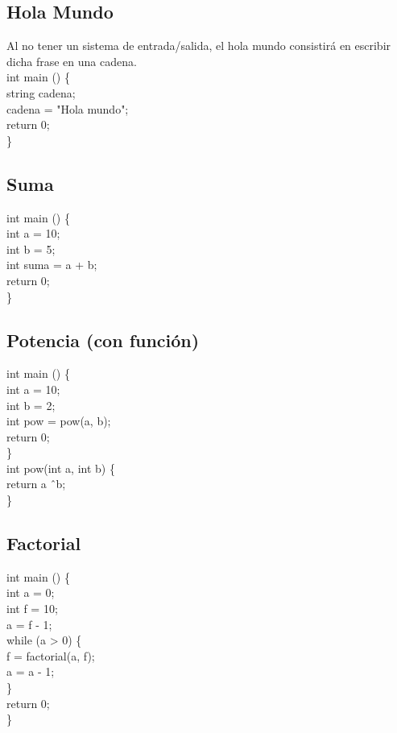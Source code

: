 \documentclass[a4paper, 12pt]{article}
\begin{document}
\subsection{Hola Mundo}
Al no tener un sistema de entrada/salida, el hola mundo consistirá en escribir dicha frase en una cadena.\\

int main () \{ \\
string cadena;\\
cadena = "Hola mundo";\\
return 0;\\
\}

\subsection{Suma}
int main () \{ \\
int a = 10;\\
int b = 5;\\
int suma = a + b;\\
return 0;\\
\}

\subsection{Potencia (con función)}
int main () \{ \\
int a = 10;\\
int b = 2;\\
int pow = pow(a, b);\\
return 0;\\
\}\\

int pow(int a, int b) \{ \\
return a \^\ b;\\
\}
\newpage

\subsection{Factorial}
int main () \{ \\
int a = 0;\\
int f = 10;\\
a = f - 1;\\
while (a > 0) \{ \\
f = factorial(a, f);\\
a = a - 1;\\
\} \\
return 0;\\
\}\\
\end{document}
